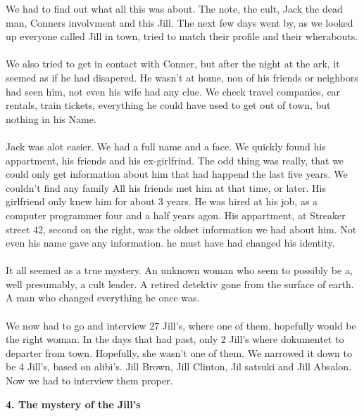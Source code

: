 \documentclass[]{article}
\begin{document}
We had to find out what all this was about. The note, the cult, Jack the dead man, Conners involvment and this Jill. The next few days went by, as we looked up everyone called Jill in town, tried to match their profile and their wherabouts. 
\\ \\
We also tried to get in contact with Conner, but after the night at the ark, it seemed as if he had disapered. He wasn't at home, non of his friends or neighbors had seen him, not even his wife had any clue. We check travel companies, car rentals, train tickets, everything he could have used to get out of town, but nothing in his Name. 
\\ \\
Jack was alot easier. We had a full name and a face. We quickly found his appartment, his friends and his ex-girlfrind. The odd thing was really, that we could only get information about him that had happend the last five years. We couldn't find any family All his friends met him at that time, or later. His girlfriend only knew him for about 3 years. He was hired at his job, as a computer programmer four and a half years agon. His appartment, at Streaker street 42, second on the right, was the oldset information we had about him. Not even his name gave any information. he must have had changed his identity. 
\\ \\
It all seemed as a true mystery. An unknown woman who seem to possibly be a, well presumably, a cult leader. A retired detektiv gone from the surface of earth. A man who changed everything he once was.
\\ \\
We now had to go and interview 27 Jill's, where one of them, hopefully would be the right woman. In the days that had past, only 2 Jill's where dokumentet to departer from town. Hopefully, she wasn't one of them. We narrowed it down to be 4 Jill's, based on alibi's. Jill Brown, Jill Clinton, Jil satsuki and Jill Absalon. Now we had to interview them proper.

\begin{center}
	\large\textbf{4. The mystery of the Jill's}
\end{center}
\end{document}
